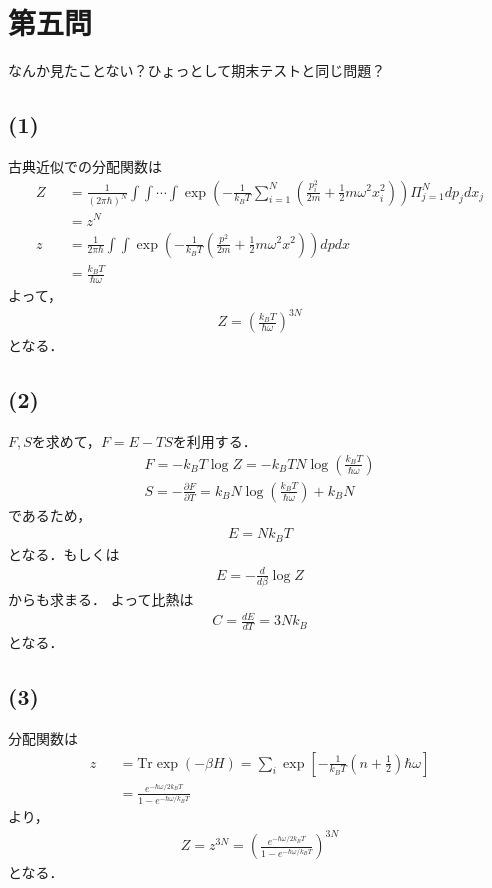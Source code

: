 \documentclass[12pt,dvipdfmx]{jsarticle}
\begin{document}
\section*{\Large{第五問}}
なんか見たことない？ひょっとして期末テストと同じ問題？
\subsection*{(1)}
古典近似での分配関数は
\begin{eqnarray}
  Z &&= \frac{1}{(2\pi\hbar)^N}\int\int\cdots\int\exp\left( -\frac{1}{k_BT} \sum_{i=1}^{N}\left( \frac{p_i^2}{2m} + \frac{1}{2}m\omega^2 x_i^2 \right) \right)\Pi_{j=1}^{N}dp_j dx_j\\
  &&=z^N\\
  z&&= \frac{1}{2\pi\hbar}\int\int \exp\left( -\frac{1}{k_BT} \left( \frac{p^2}{2m} + \frac{1}{2}m\omega^2 x^2 \right) \right)dp dx\\
  &&= \frac{k_B T}{\hbar\omega}
\end{eqnarray}
よって，
\begin{eqnarray}
  Z = \left( \frac{k_B T}{\hbar\omega} \right)^{3N}
\end{eqnarray}
となる．
\subsection*{(2)}
$F,S$を求めて，$F = E-TS$を利用する．
\begin{eqnarray}
  F = - k_B T \log Z = - k_B T N \log\left( \frac{k_B T}{\hbar\omega} \right)\\
  S = -\frac{\partial F}{\partial T} = k_B N \log\left( \frac{k_B T}{\hbar\omega} \right) + k_BN
\end{eqnarray}
であるため，
\begin{eqnarray}
  E = Nk_B T
\end{eqnarray}
となる．もしくは
\begin{eqnarray}
  E = -\frac{d}{d\beta}\log Z
\end{eqnarray}
からも求まる．
よって比熱は
\begin{eqnarray}
  C = \frac{dE}{dT} = 3Nk_B
\end{eqnarray}
となる．
\subsection*{(3)}
分配関数は
\begin{eqnarray}
  z &&= \text{Tr} \exp\left( -\beta H \right) = \sum_i \exp\left[ -\frac{1}{k_BT} \left( n+ \frac{1}{2} \right)\hbar\omega \right]\\
  &&=\frac{e^{-\hbar\omega/2k_BT}}{1-e^{-\hbar\omega/k_BT}}
\end{eqnarray}
より，
\begin{eqnarray}
  Z = z^{3N} = \left( \frac{e^{-\hbar\omega/2k_BT}}{1-e^{-\hbar\omega/k_BT}} \right)^{3N}
\end{eqnarray}
となる．
\end{document}
